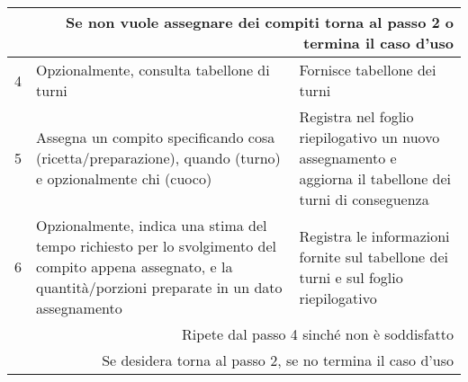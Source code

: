 \begin{table}[H]
\begin{tabular}{|c|p{7cm}|p{6.5cm}|}
        \multicolumn{3}{|r|}{Se non vuole assegnare dei compiti torna al passo 2 o termina il caso d’uso}                                                                                                                                                                                                                                                                                                                            \\\hline
        4                  & Opzionalmente, consulta tabellone di turni                                                                                                                    & Fornisce tabellone dei turni                                                                                                                                                                                                            \\\hline
        5                  & Assegna un compito specificando cosa (ricetta/preparazione), quando (turno) e opzionalmente chi (cuoco)                                                       & Registra nel foglio riepilogativo un nuovo assegnamento e aggiorna il tabellone dei turni di conseguenza                                                                                                                                \\\hline
        6                  & Opzionalmente, indica una stima del tempo richiesto per lo svolgimento del compito appena assegnato, e la quantità/porzioni preparate in un dato assegnamento & Registra le informazioni fornite sul tabellone dei turni e sul foglio riepilogativo                                                                                                                                                     \\\hline
        \multicolumn{3}{|r|}{Ripete dal passo 4 sinché non è soddisfatto}                                                                                                                                                                                                                                                                                                                                                            \\
        \multicolumn{3}{|r|}{Se desidera torna al passo 2, se no termina il caso d’uso}                                                                                                                                                                                                                                                                                                                                              \\\hline
    \end{tabular}
\end{table}

